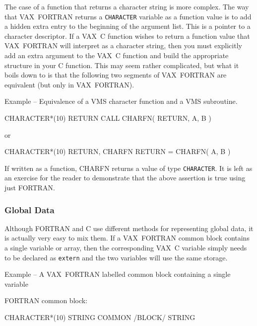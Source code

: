 \documentclass[twoside,11pt,nolof]{starlink}
\newcounter{examples}
\begin{document}
The case of a function that returns a character string is more complex. The way
that VAX~FORTRAN returns a \texttt{CHARACTER} variable as a function value is
to add a hidden extra entry to the beginning of the argument list.
This is a pointer to
a character descriptor. If a VAX~C function wishes to return a function value
that VAX~FORTRAN will interpret as a character string, then you must explicitly
add an extra argument to the VAX~C function and build the appropriate structure
in your C function. This may seem rather complicated, but what it boils down to
is that the following two segments of VAX~FORTRAN are equivalent (but only in
VAX~FORTRAN).

\pagebreak[3]
\label{vms_charfn}
\begin{center}
Example\latex{~\ref{vms_charfn}}
-- Equivalence of a VMS character function and a
VMS subroutine.
\end{center}
\nopagebreak[4]
\begin{small}
\begin{terminalv}
      CHARACTER*(10) RETURN
      CALL CHARFN( RETURN, A, B )
\end{terminalv}
\end{small}
   or
\begin{small}
\begin{terminalv}
      CHARACTER*(10) RETURN, CHARFN
      RETURN = CHARFN( A, B )
\end{terminalv}
\end{small}
If written as a function, CHARFN returns a value of type \texttt{CHARACTER}\@.
It is left as an exercise for the reader to demonstrate that the above
assertion is true using just FORTRAN\@.

\subsubsection{Global Data}

Although FORTRAN and C use different methods for representing global data, it is
actually very easy to mix them. If a VAX~FORTRAN common block contains a single
variable or array, then the corresponding VAX~C variable simply needs to be
declared as \texttt{extern} and the two variables will use the same storage.

\label{vms_common}
\begin{center}
Example\latex{~\ref{vms_common}}
-- A VAX~FORTRAN labelled common block containing a single variable
\end{center}
\nopagebreak[4]
FORTRAN common block:
\begin{small}
\begin{terminalv}
      CHARACTER*(10) STRING
      COMMON /BLOCK/ STRING
\end{terminalv}
\end{small}
\end{document}
